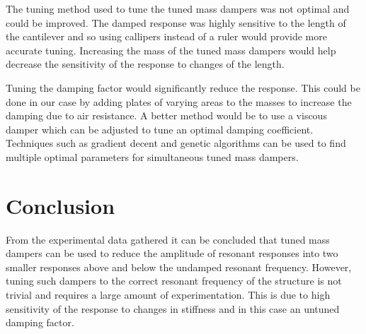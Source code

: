 \documentclass[8pt]{article}
\begin{document}
The tuning method used to tune the tuned mass dampers was not optimal and could be improved.
The damped response was highly sensitive to the length of the cantilever and so using callipers instead of a ruler would provide more accurate tuning.
Increasing the mass of the tuned mass dampers would help decrease the sensitivity of the response to changes of the length.

Tuning the damping factor would significantly reduce the response. This could be done in our case 
by adding plates of varying areas to the masses to increase the damping due to air resistance.
A better method would be to use a viscous damper which can be adjusted to tune an optimal damping coefficient.
Techniques such as gradient decent and genetic algorithms can be used to find multiple optimal parameters for simultaneous tuned mass dampers.

\vspace{-20pt}
\section{Conclusion}
\vspace{-16pt}

From the experimental data gathered it can be concluded that tuned mass dampers can be used to reduce the amplitude of resonant responses into two
smaller responses above and below the undamped resonant frequency.
However, tuning such dampers to the correct resonant frequency of the structure is not trivial and requires a large amount of experimentation.
This is due to high sensitivity of the response to changes in stiffness and in this case an untuned damping factor.
\end{document}
